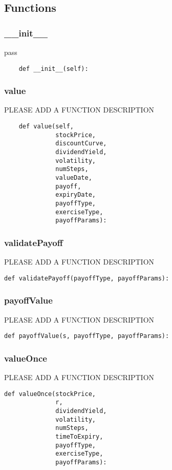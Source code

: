 \documentclass[twoside,11pt]{book}
\begin{document}
\subsection*{Functions}

\subsubsection*{{\bf \_\_init\_\_}}
pass 

\begin{lstlisting}
    def __init__(self):
\end{lstlisting}

\subsubsection*{{\bf value}}
PLEASE ADD A FUNCTION DESCRIPTION

\begin{lstlisting}
    def value(self,
              stockPrice,
              discountCurve,
              dividendYield,
              volatility,
              numSteps,
              valueDate,
              payoff,
              expiryDate,
              payoffType,
              exerciseType,
              payoffParams):
\end{lstlisting}

\subsubsection*{{\bf validatePayoff}}
PLEASE ADD A FUNCTION DESCRIPTION

\begin{lstlisting}
def validatePayoff(payoffType, payoffParams):
\end{lstlisting}

\subsubsection*{{\bf payoffValue}}
PLEASE ADD A FUNCTION DESCRIPTION

\begin{lstlisting}
def payoffValue(s, payoffType, payoffParams):
\end{lstlisting}

\subsubsection*{{\bf valueOnce}}
PLEASE ADD A FUNCTION DESCRIPTION

\begin{lstlisting}
def valueOnce(stockPrice,
              r,
              dividendYield,
              volatility,
              numSteps,
              timeToExpiry,
              payoffType,
              exerciseType,
              payoffParams):
\end{lstlisting}
\end{document}
